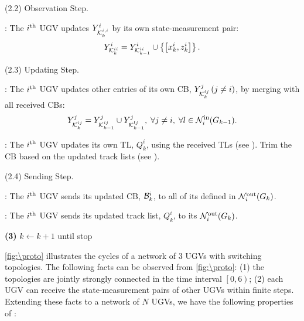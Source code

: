 \begin{algorithm}
\begin{algorithmic}
			\State (2.2) Observation Step.
			
			\CB: The $i^\text{th}$ UGV updates $Y^i_{\mathcal{K}^{i,i}_{k}}$ by its own state-measurement pair: %
			\small\begin{equation*}
			Y^i_{\mathcal{K}^{ii}_{k}} = Y^i_{\mathcal{K}^{ii}_{k-1}} \cup \left\lbrace{\left[x^i_k,z^i_k\right]}\right\rbrace.
			\end{equation*}\normalsize
						
			\State (2.3) Updating Step.
			
			\CB: The $i^\text{th}$ UGV updates other entries of its own CB, $Y^j_{\mathcal{K}^{ij}_{k}}\,(j\neq i)$, by merging with all received CBs:						
			\small\begin{equation*}
				Y^j_{\mathcal{K}^{ij}_{k}} = Y^j_{\mathcal{K}^{ij}_{k-1}} \cup Y^j_{\mathcal{K}^{lj}_{k-1}},
				\; \forall j\neq i,\;\forall l\in \mathcal{N}^\text{in}_i(G_{k-1}).
			\end{equation*}\normalsize
			
			\TL: The $i^\text{th}$ UGV updates its own TL, $Q^i_k$, using the received TLs (see ).
			Trim the CB based on the updated track lists (see ). 
			
			\State (2.4) Sending Step.
			
			\CB: The $i^\text{th}$ UGV sends its updated CB, \small$\mathcal{B}^i_k$\normalsize, 
			to all of its {\onbhd} defined in $\mathcal{N}^\text{out}_i(G_k)$.
			
			\TL: The $i^\text{th}$ UGV sends its updated track list, $Q^i_k$, to its {\onbhd} $\mathcal{N}^\text{out}_i(G_k)$.
			
			\State \textbf{(3)} $k\leftarrow k+1$ until stop
		\end{algorithmic}
	\end{algorithm}
	\cref{fig:\proto} illustrates the {\proto} cycles of a network of 3 UGVs with switching topologies.
	The following facts can be observed from \cref{fig:\proto}: 
	(1) the topologies are jointly strongly connected in the time interval $\left[0,6\right)$;
	(2) each UGV can receive the state-measurement pairs of other UGVs within finite steps.
	Extending these facts to a network of $N$ UGVs, we have the following properties of \proto:
	
